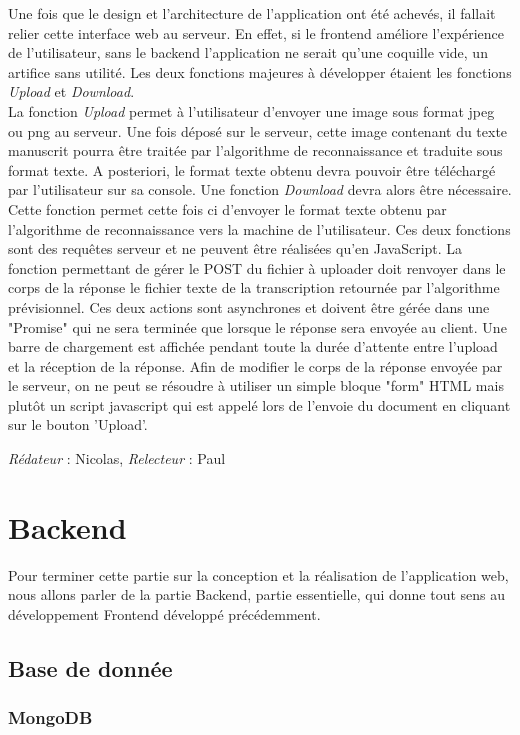\documentclass[oneside,a4paper,13pt]{article}
\begin{document}
Une fois que le design et l’architecture de l’application ont été achevés, il fallait relier cette interface web au serveur. En effet, si le frontend améliore l’expérience de l’utilisateur, sans le backend l’application ne serait qu’une coquille vide, un artifice sans utilité. 
\medbreak
Les deux fonctions majeures à développer étaient les fonctions \textit{Upload} et \textit{Download}. 
\\
La fonction \textit{Upload} permet à l’utilisateur d’envoyer une image sous format jpeg ou png au serveur. Une fois déposé sur le serveur, cette image contenant du texte manuscrit pourra être traitée par l’algorithme de reconnaissance et traduite sous format texte. 
A posteriori, le format texte obtenu devra pouvoir être téléchargé par l’utilisateur sur sa console. Une fonction \textit{Download} devra alors être nécessaire. Cette fonction permet cette fois ci d’envoyer le format texte obtenu par l’algorithme de reconnaissance vers la machine de l’utilisateur. 
\smallbreak
Ces deux fonctions sont des requêtes serveur et ne peuvent être réalisées qu’en JavaScript. La fonction permettant de gérer le POST du fichier à uploader doit renvoyer dans le corps de la réponse le fichier texte de la transcription retournée par l'algorithme prévisionnel. Ces deux actions sont asynchrones et doivent être gérée dans une "Promise" qui ne sera terminée que lorsque le réponse sera envoyée au client. Une barre de chargement est affichée pendant toute la durée d'attente entre l'upload et la réception de la réponse. Afin de modifier le corps de la réponse envoyée par le serveur, on ne peut se résoudre à utiliser un simple bloque "form" HTML mais plutôt un script javascript qui est appelé lors de l'envoie du document en cliquant sur le bouton 'Upload'.

\smallbreak\textit{Rédateur} : Nicolas, \textit{Relecteur} : Paul
\section{Backend}

Pour terminer cette partie sur la conception et la réalisation de l'application web, nous allons parler de la partie Backend, partie essentielle, qui donne tout sens au développement Frontend développé précédemment. 
\subsection{Base de donnée}
\subsubsection{MongoDB}
\end{document}
